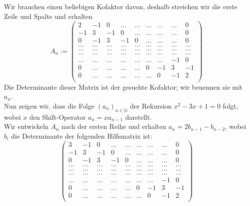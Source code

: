 Wir brauchen einen beliebigen Kofaktor davon, deshalb streichen wir die erste Zeile und Spalte und erhalten\\
\begin{equation}
A_n:=
\begin{pmatrix}
2&-1&0&\ldots&\ldots&\ldots&\ldots&\ldots&0\\
-1&3&-1&0&\ldots&\ldots&\ldots&\ldots&0\\
0&-1&3&-1&0&\ldots&\ldots&\ldots&0\\
\ldots&\ldots&\ldots&\ldots&\ldots&\ldots&\ldots&\ldots&\ldots\\
\ldots&\ldots&\ldots&\ldots&\ldots&\ldots&\ldots&\ldots&\ldots\\
\ldots&\ldots&\ldots&\ldots&\ldots&\ldots&\ldots&\ldots&\ldots\\
\ldots&\ldots&\ldots&\ldots&\ldots&\ldots&\ldots&-1&0\\
0&\ldots&\ldots&\ldots&\ldots&0&-1&3&-1\\
0&\ldots&\ldots&\ldots&\ldots&\ldots&0&-1&2\\
\end{pmatrix}
\end{equation}
Die Determinante dieser Matrix ist der gesuchte Kofaktor; wir benennen sie mit $a_n$.\\
Nun zeigen wir, dass die Folge $(a_n)_{n \in \mathbb{N}}$ der Rekursion $x^2-3x+1=0$ folgt, \\wobei $x$ den Shift-Operator $a_n = xa_{n-1}$ darstellt.\\
Wir entwickeln $A_n$ nach der ersten Reihe und erhalten $a_n = 2b_{n-1} - b_{n-2}$, wobei $b_i$ die Determinante der folgenden Hilfsmatrix ist:\\
\begin{equation}
\begin{pmatrix}
3&-1&0&\ldots&\ldots&\ldots&\ldots&\ldots&0\\
-1&3&-1&0&\ldots&\ldots&\ldots&\ldots&0\\
0&-1&3&-1&0&\ldots&\ldots&\ldots&0\\
\ldots&\ldots&\ldots&\ldots&\ldots&\ldots&\ldots&\ldots&\ldots\\
\ldots&\ldots&\ldots&\ldots&\ldots&\ldots&\ldots&\ldots&\ldots\\
\ldots&\ldots&\ldots&\ldots&\ldots&\ldots&\ldots&\ldots&\ldots\\
\ldots&\ldots&\ldots&\ldots&\ldots&\ldots&\ldots&-1&0\\
0&\ldots&\ldots&\ldots&\ldots&0&-1&3&-1\\
0&\ldots&\ldots&\ldots&\ldots&\ldots&0&-1&2\\
\end{pmatrix}
\end{equation}
